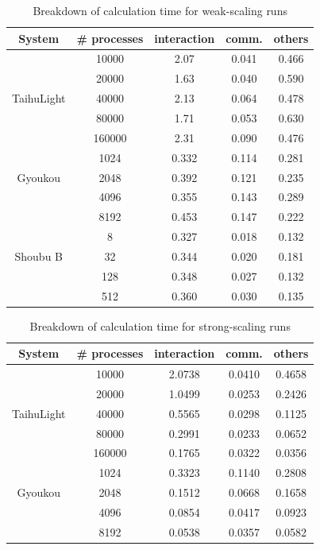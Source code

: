 \documentclass[conference]{IEEEtran}
\begin{document}
\begin{table}
\centering
  \caption{Breakdown of calculation time for weak-scaling runs}
  \label{tab:timeweak}
  \begin{tabular}{ccccc}
    \hline
 System  & \# processes & interaction & comm. & others\\
    \hline  
&10000 &   2.07& 0.041 & 0.466\\
&20000 &  1.63& 0.040  & 0.590 \\
TaihuLight &40000  &  2.13 & 0.064 & 0.478 \\
&80000 &   1.71 & 0.053 & 0.630\\
&160000 &  2.31& 0.090& 0.476\\
\hline
&1024&  0.332 &  0.114 & 0.281\\
Gyoukou &2048&   0.392 & 0.121 & 0.235\\
&4096&  0.355 & 0.143& 0.289\\
&8192   & 0.453& 0.147&     0.222\\
\hline
        &8&  0.327 &  0.018 & 0.132\\
Shoubu B &32&   0.344 & 0.020 & 0.181\\
        &128&  0.348 & 0.027& 0.132\\
        &512& 0.360& 0.030&     0.135\\
\hline
\end{tabular}
\end{table}

\begin{table}
\centering
  \caption{Breakdown of calculation time for strong-scaling runs}
  \label{tab:timestrong}
  \begin{tabular}{ccccc}
    \hline
 System  & \# processes & interaction & comm. & others\\
    \hline  
& 10000& 2.0738 & 0.0410 & 0.4658 \\
& 20000& 1.0499 & 0.0253 & 0.2426 \\
TaihuLight & 40000& 0.5565 & 0.0298 & 0.1125 \\
& 80000& 0.2991 & 0.0233 & 0.0652 \\
& 160000& 0.1765 & 0.0322 & 0.0356 \\
\hline
& 1024& 0.3323 & 0.1140 & 0.2808 \\
Gyoukou & 2048& 0.1512 & 0.0668 & 0.1658 \\
& 4096& 0.0854 & 0.0417 & 0.0923 \\
& 8192& 0.0538 & 0.0357 & 0.0582 \\
    \hline  
\end{tabular}
\end{table}
 
\end{document}
